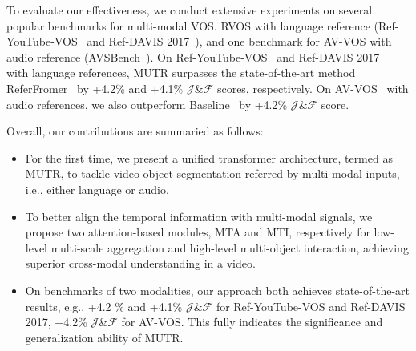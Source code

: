 \documentclass{article}
\begin{document}
To evaluate our effectiveness, we conduct extensive experiments on several popular benchmarks for multi-modal VOS.
RVOS with language reference (Ref-YouTube-VOS~\cite{seo2020urvos} and Ref-DAVIS 2017~\cite{khoreva2019video}), and one benchmark for AV-VOS with audio reference (AVSBench~\cite{zhou2022audio}). 
On Ref-YouTube-VOS~\cite{seo2020urvos} and Ref-DAVIS 2017~\cite{khoreva2019video} with language references, MUTR surpasses the state-of-the-art method ReferFromer~\cite{wu2022language} by +4.2\%  and +4.1\% $\mathcal{J}\&\mathcal{F}$ scores, respectively. On AV-VOS~\cite{zhou2022audio} with audio references, we also outperform Baseline~\cite{zhou2022audio} by +4.2\% $\mathcal{J}\&\mathcal{F}$ score.


Overall, our contributions are summaried as follows:

\begin{itemize}
   \item For the first time, we present a unified transformer architecture, termed as MUTR, to tackle video object segmentation referred by multi-modal inputs, i.e., either language or audio.

   \item To better align the temporal information with multi-modal signals, we propose two attention-based modules, MTA and MTI, respectively for low-level multi-scale aggregation and high-level multi-object interaction, achieving superior cross-modal understanding in a video.

   \item On benchmarks of two modalities, our approach both achieves state-of-the-art results, e.g., 
   +4.2 \% and +4.1\% $\mathcal{J}\&\mathcal{F}$ for Ref-YouTube-VOS  and  Ref-DAVIS 2017, +4.2\% $\mathcal{J}\&\mathcal{F}$ for AV-VOS. This fully indicates the significance and generalization ability of MUTR.

   
\end{itemize}
\end{document}
